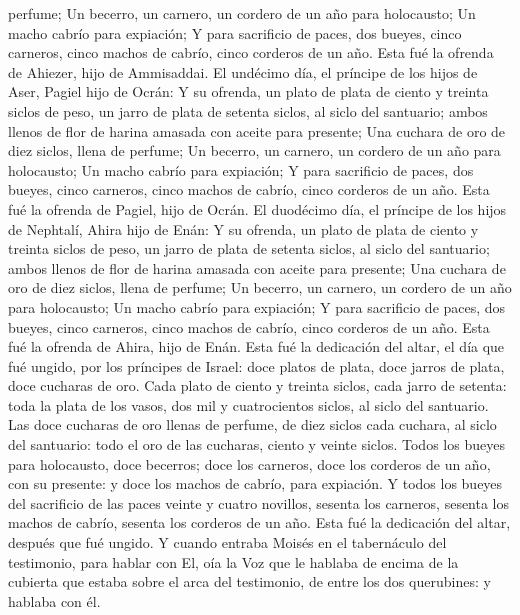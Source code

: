 perfume;  Un becerro, un carnero, un cordero de un año
para holocausto;  Un macho cabrío para expiación;
 Y para sacrificio de paces, dos bueyes, cinco carneros,
cinco machos de cabrío, cinco corderos de un año. Esta fué la ofrenda de
Ahiezer, hijo de Ammisaddai.  El undécimo día, el
príncipe de los hijos de Aser, Pagiel hijo de Ocrán:  Y
su ofrenda, un plato de plata de ciento y treinta siclos de peso, un
jarro de plata de setenta siclos, al siclo del santuario; ambos llenos
de flor de harina amasada con aceite para presente;  Una
cuchara de oro de diez siclos, llena de perfume;  Un
becerro, un carnero, un cordero de un año para holocausto;
 Un macho cabrío para expiación;  Y para
sacrificio de paces, dos bueyes, cinco carneros, cinco machos de cabrío,
cinco corderos de un año. Esta fué la ofrenda de Pagiel, hijo de Ocrán.
 El duodécimo día, el príncipe de los hijos de Nephtalí,
Ahira hijo de Enán:  Y su ofrenda, un plato de plata de
ciento y treinta siclos de peso, un jarro de plata de setenta siclos, al
siclo del santuario; ambos llenos de flor de harina amasada con aceite
para presente;  Una cuchara de oro de diez siclos, llena
de perfume;  Un becerro, un carnero, un cordero de un año
para holocausto;  Un macho cabrío para expiación;
 Y para sacrificio de paces, dos bueyes, cinco carneros,
cinco machos de cabrío, cinco corderos de un año. Esta fué la ofrenda de
Ahira, hijo de Enán.  Esta fué la dedicación del altar,
el día que fué ungido, por los príncipes de Israel: doce platos de
plata, doce jarros de plata, doce cucharas de oro.  Cada
plato de ciento y treinta siclos, cada jarro de setenta: toda la plata
de los vasos, dos mil y cuatrocientos siclos, al siclo del santuario.
 Las doce cucharas de oro llenas de perfume, de diez
siclos cada cuchara, al siclo del santuario: todo el oro de las
cucharas, ciento y veinte siclos.  Todos los bueyes para
holocausto, doce becerros; doce los carneros, doce los corderos de un
año, con su presente: y doce los machos de cabrío, para expiación.
 Y todos los bueyes del sacrificio de las paces veinte y
cuatro novillos, sesenta los carneros, sesenta los machos de cabrío,
sesenta los corderos de un año. Esta fué la dedicación del altar,
después que fué ungido.  Y cuando entraba Moisés en el
tabernáculo del testimonio, para hablar con El, oía la Voz que le
hablaba de encima de la cubierta que estaba sobre el arca del
testimonio, de entre los dos querubines: y hablaba con él.

